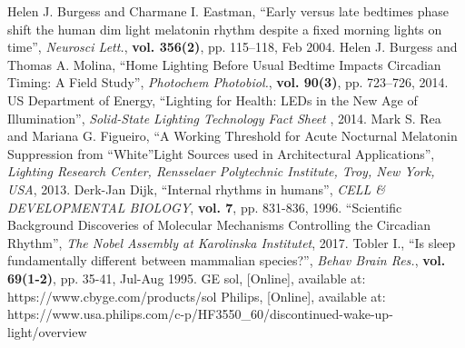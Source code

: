 \begin{thebibliography}{5}
 Helen J. Burgess and Charmane I. Eastman, ``Early versus late bedtimes phase shift the human dim light melatonin rhythm despite a fixed morning lights on time'', \emph{Neurosci Lett.}, {\bf vol. 356(2)}, pp. 115–118, Feb 2004.
 Helen J. Burgess and Thomas A. Molina, ``Home Lighting Before Usual Bedtime Impacts Circadian Timing: A Field Study'', \emph{Photochem Photobiol.}, {\bf vol. 90(3)}, pp. 723–726, 2014.
 US Department of Energy, ``Lighting for Health: LEDs in the New Age of Illumination'', \emph{Solid-State Lighting Technology Fact Sheet }, 2014.
 Mark S. Rea and Mariana G. Figueiro, ``A Working Threshold for Acute Nocturnal Melatonin Suppression from “White”Light Sources used in Architectural Applications'', \emph{Lighting Research Center, Rensselaer Polytechnic Institute, Troy, New York, USA}, 2013.
 Derk-Jan Dijk, ``Internal rhythms in humans'', \emph{CELL \& DEVELOPMENTAL BIOLOGY}, {\bf vol. 7}, pp. 831-836, 1996.
 ``Scientific Background Discoveries of Molecular Mechanisms Controlling the Circadian Rhythm'', \emph{The Nobel Assembly at Karolinska Institutet}, 2017.
 Tobler I., ``Is sleep fundamentally different between mammalian species?'', \emph{Behav Brain Res.}, {\bf vol. 69(1-2)}, pp. 35-41, Jul-Aug 1995.
 GE sol, [Online], available at: https://www.cbyge.com/products/sol
 Philips, [Online], available at: https://www.usa.philips.com/c-p/HF3550\_60/discontinued-wake-up-light/overview
\end{thebibliography}
